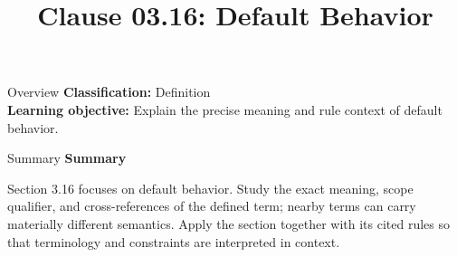 \documentclass[10pt,letterpaper]{article}
\title{Clause 03.16: Default Behavior}
\author{}
\date{}
\begin{document}
\maketitle
\begin{CornellOverviewBox}{Overview}
\textbf{Classification:} Definition\\[2pt]
\textbf{Learning objective:} Explain the precise meaning and rule context of default behavior.
\end{CornellOverviewBox}\begin{CornellSummaryBox}{Summary}
{\sffamily\bfseries\color{Accent} Summary}\par\vspace{3pt}Section 3.16 focuses on default behavior. Study the exact meaning, scope qualifier, and cross-references of the defined term; nearby terms can carry materially different semantics. Apply the section together with its cited rules so that terminology and constraints are interpreted in context.
\end{CornellSummaryBox}
\end{document}
